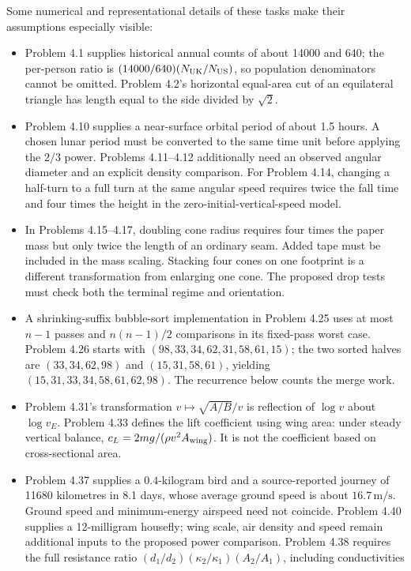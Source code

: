 Some numerical and representational details of these tasks make their
assumptions especially visible:
\begin{itemize}
\item Problem 4.1 supplies historical annual counts of about 14000 and 640;
the per-person ratio is \((14000/640)(N_{\rm UK}/N_{\rm US})\), so population
denominators cannot be omitted. Problem 4.2's horizontal equal-area cut of
an equilateral triangle has length equal to the side divided by \(\sqrt2\).
\item Problem 4.10 supplies a near-surface orbital period of about
1.5 hours. A chosen lunar period must be converted to the same time unit
before applying the \(2/3\) power. Problems 4.11--4.12 additionally need an
observed angular diameter and an explicit density comparison.
For Problem 4.14, changing a half-turn to a full turn at the same angular
speed requires twice the fall time and four times the height in the
zero-initial-vertical-speed model.
\item In Problems 4.15--4.17, doubling cone radius requires four times the
paper mass but only twice the length of an ordinary seam. Added tape must
be included in the mass scaling. Stacking four cones on one footprint is
a different transformation from enlarging one cone. The proposed drop tests
must check both the terminal regime and orientation.
\item A shrinking-suffix bubble-sort implementation in Problem 4.25 uses
at most \(n-1\) passes and \(n(n-1)/2\) comparisons in its fixed-pass worst
case. Problem 4.26 starts with
\((98,33,34,62,31,58,61,15)\); the two sorted halves are
\((33,34,62,98)\) and \((15,31,58,61)\), yielding
\((15,31,33,34,58,61,62,98)\). The recurrence below counts the merge work.
\item Problem 4.31's transformation \(v\mapsto\sqrt{A/B}/v\) is reflection
of \(\log v\) about \(\log v_E\). Problem 4.33 defines the lift coefficient
using wing area: under steady vertical balance,
\(c_L=2mg/(\rho v^2A_{\rm wing})\). It is not the coefficient based on
cross-sectional area.
\item Problem 4.37 supplies a \(0.4\)-kilogram bird and a source-reported
journey of 11680 kilometres in 8.1 days, whose average ground speed is about
\(16.7\,\mathrm{m/s}\). Ground speed and minimum-energy airspeed need not
coincide. Problem 4.40 supplies a 12-milligram housefly; wing scale,
air density and speed remain additional inputs to the proposed power
comparison. Problem 4.38 requires the full resistance ratio
\((d_1/d_2)(\kappa_2/\kappa_1)(A_2/A_1)\), including conductivities

\end{itemize}
